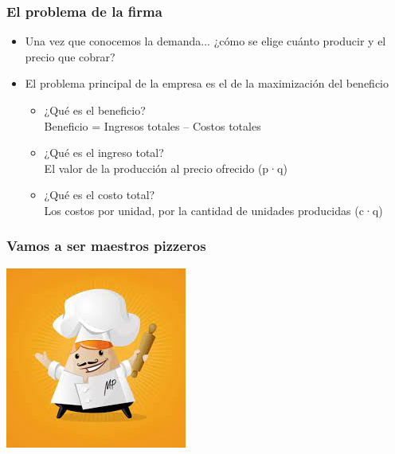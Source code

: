 \documentclass{beamer}
\begin{document}
\begin{frame}
\frametitle{El problema de la firma}
\begin{itemize}
    \item Una vez que conocemos la demanda... ¿cómo se elige cuánto producir y el precio que cobrar?
    \vspace{2mm}
    \item El problema principal de la empresa es el de la maximización del beneficio
    \vspace{2mm}     \begin{itemize}
        \item ¿Qué es el beneficio? \vspace{2mm} \\ 
        Beneficio = Ingresos totales – Costos totales
        \vspace{2mm}
        \item ¿Qué es el ingreso total? 
        \vspace{2mm} \\ 
        El valor de la producción al precio ofrecido (p·q)
        \vspace{2mm}
        \item ¿Qué es el costo total?
        \vspace{2mm} \\ 
        Los costos por unidad, por la cantidad de unidades producidas (c·q)
    \end{itemize} 
\end{itemize} 
\end{frame}

\begin{frame}
\frametitle{Vamos a ser maestros pizzeros}
\centering
\includegraphics[scale=0.6]{Slides Principios de Economia/Figures/Tema_06.12_maestrospizzeros.jpg}
\end{frame}
\end{document}
